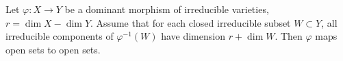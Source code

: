 Let $\varphi: X \rightarrow Y$ be a dominant morphism of irreducible varieties, $r = \dim X - \dim Y$. Assume that for each closed irreducible subset $W \subset Y$, all irreducible components of $\varphi^{-1}(W)$ have dimension $r + \dim W$. Then $\varphi$ maps open sets to open sets.
